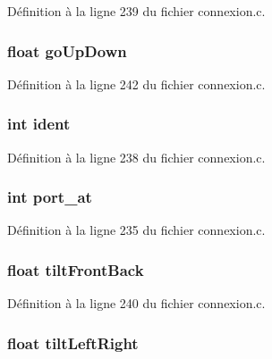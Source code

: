 Définition à la ligne 239 du fichier connexion.\-c.

\hypertarget{structardrone_a0aeff16c8eb63da12be0a1b57bc10487}{
\subsubsection[{go\-Up\-Down}]{\setlength{\rightskip}{0pt plus 5cm}float go\-Up\-Down}}\label{structardrone_a0aeff16c8eb63da12be0a1b57bc10487}


Définition à la ligne 242 du fichier connexion.\-c.

\hypertarget{structardrone_a52e7dc3872878f8c40cd3523fed00c80}{
\subsubsection[{ident}]{\setlength{\rightskip}{0pt plus 5cm}int ident}}\label{structardrone_a52e7dc3872878f8c40cd3523fed00c80}


Définition à la ligne 238 du fichier connexion.\-c.

\hypertarget{structardrone_a57f99d232635ffded0d59ea9475639a2}{
\subsubsection[{port\-\_\-at}]{\setlength{\rightskip}{0pt plus 5cm}int port\-\_\-at}}\label{structardrone_a57f99d232635ffded0d59ea9475639a2}


Définition à la ligne 235 du fichier connexion.\-c.

\hypertarget{structardrone_a97a469c16f6798fa7e85ad88a725bdaa}{
\subsubsection[{tilt\-Front\-Back}]{\setlength{\rightskip}{0pt plus 5cm}float tilt\-Front\-Back}}\label{structardrone_a97a469c16f6798fa7e85ad88a725bdaa}


Définition à la ligne 240 du fichier connexion.\-c.

\hypertarget{structardrone_ae7202985f7f7b5088481dff26f52e319}{
\subsubsection[{tilt\-Left\-Right}]{\setlength{\rightskip}{0pt plus 5cm}float tilt\-Left\-Right}}\label{structardrone_ae7202985f7f7b5088481dff26f52e319}


